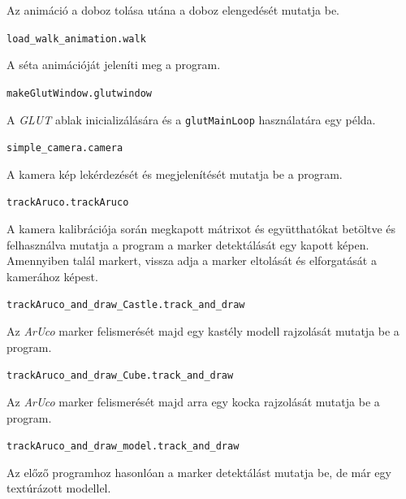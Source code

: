 \medskip

Az animáció a doboz tolása utána a doboz elengedését mutatja be.

\bigskip

\noindent \texttt{load\_walk\_animation.walk}

\medskip

A séta animációját jeleníti meg a program.

\bigskip

\noindent \texttt{makeGlutWindow.glutwindow}

\medskip

A \textit{GLUT} ablak inicializálására és a \texttt{glutMainLoop} használatára egy példa.

\bigskip

\noindent \texttt{simple\_camera.camera}

\medskip

A kamera kép lekérdezését és megjelenítését mutatja be a program.

\bigskip

\noindent \texttt{trackAruco.trackAruco}

\medskip

A kamera kalibrációja során megkapott mátrixot és együtthatókat betöltve és
felhasználva mutatja a program a marker detektálását egy kapott képen.
Amennyiben talál markert, vissza adja a marker eltolását és elforgatását a kamerához képest.

\bigskip

\noindent \texttt{trackAruco\_and\_draw\_Castle.track\_and\_draw}

\medskip

Az \textit{ArUco} marker felismerését majd egy kastély modell rajzolását mutatja be a program.

\bigskip

\noindent \texttt{trackAruco\_and\_draw\_Cube.track\_and\_draw}

\medskip
	
Az \textit{ArUco} marker felismerését majd arra egy kocka rajzolását mutatja be a program.

\bigskip

\noindent \texttt{trackAruco\_and\_draw\_model.track\_and\_draw}

\medskip
	
Az előző programhoz hasonlóan a marker detektálást mutatja be, de már egy textúrázott modellel.



